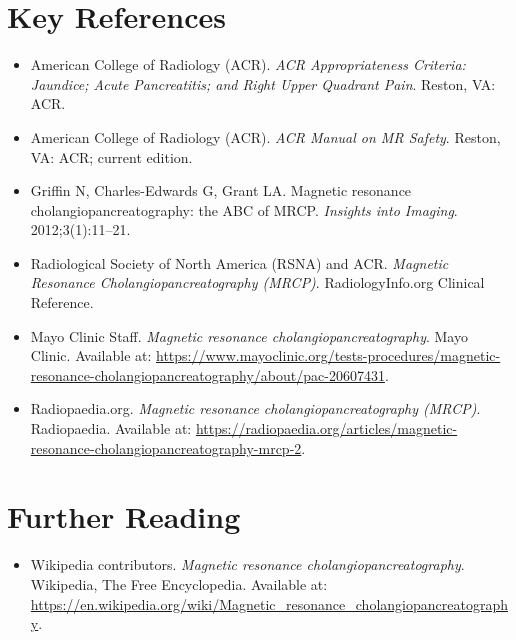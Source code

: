 \section{Key References}
\begin{itemize}
\item American College of Radiology (ACR). \textit{ACR Appropriateness Criteria: Jaundice; Acute Pancreatitis; and Right Upper Quadrant Pain}. Reston, VA: ACR.
\item American College of Radiology (ACR). \textit{ACR Manual on MR Safety}. Reston, VA: ACR; current edition.
\item Griffin N, Charles-Edwards G, Grant LA. Magnetic resonance cholangiopancreatography: the ABC of MRCP. \textit{Insights into Imaging}. 2012;3(1):11--21.
\item Radiological Society of North America (RSNA) and ACR. \textit{Magnetic Resonance Cholangiopancreatography (MRCP)}. RadiologyInfo.org Clinical Reference.
\item Mayo Clinic Staff. \textit{Magnetic resonance cholangiopancreatography}. Mayo Clinic. Available at: \url{https://www.mayoclinic.org/tests-procedures/magnetic-resonance-cholangiopancreatography/about/pac-20607431}.
\item Radiopaedia.org. \textit{Magnetic resonance cholangiopancreatography (MRCP)}. Radiopaedia. Available at: \url{https://radiopaedia.org/articles/magnetic-resonance-cholangiopancreatography-mrcp-2}.
\end{itemize}

\section{Further Reading}
\begin{itemize}
  \item Wikipedia contributors. \textit{Magnetic resonance cholangiopancreatography}. Wikipedia, The Free Encyclopedia. Available at: \url{https://en.wikipedia.org/wiki/Magnetic_resonance_cholangiopancreatography}.
\end{itemize}
